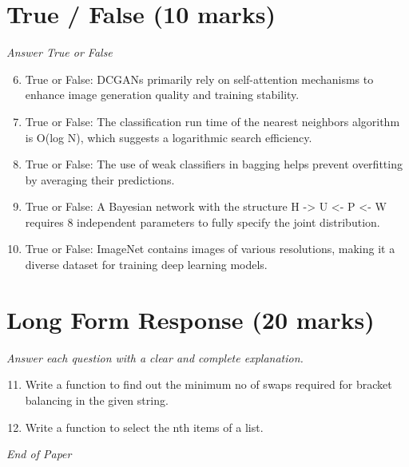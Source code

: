 \documentclass[12pt]{article}
\begin{document}
\section*{True / False (10 marks)}
\textit{Answer True or False}
\begin{enumerate}[label=\arabic*.]
\setcounter{enumi}{5}
\item True or False: DCGANs primarily rely on self-attention mechanisms to enhance image generation quality and training stability.
\item True or False: The classification run time of the nearest neighbors algorithm is O(log N), which suggests a logarithmic search efficiency.
\item True or False: The use of weak classifiers in bagging helps prevent overfitting by averaging their predictions.
\item True or False: A Bayesian network with the structure H -\textgreater{} U \textless{}- P \textless{}- W requires 8 independent parameters to fully specify the joint distribution.
\item True or False: ImageNet contains images of various resolutions, making it a diverse dataset for training deep learning models.
\end{enumerate}

\section*{Long Form Response (20 marks)}
\textit{Answer each question with a clear and complete explanation.}
\begin{enumerate}[label=\arabic*.]
\setcounter{enumi}{10}
\item Write a function to find out the minimum no of swaps required for bracket balancing in the given string.
\item Write a function to select the nth items of a list.
\end{enumerate}

\vfill
\noindent\textit{End of Paper}
\end{document}
